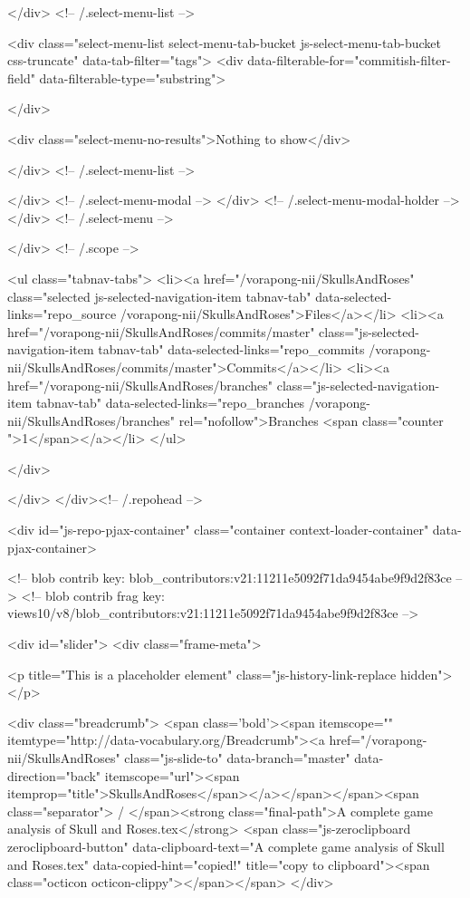          </div> <!-- /.select-menu-list -->


          <div class="select-menu-list select-menu-tab-bucket js-select-menu-tab-bucket css-truncate" data-tab-filter="tags">
            <div data-filterable-for="commitish-filter-field" data-filterable-type="substring">

            </div>

            <div class="select-menu-no-results">Nothing to show</div>

          </div> <!-- /.select-menu-list -->

        </div> <!-- /.select-menu-modal -->
      </div> <!-- /.select-menu-modal-holder -->
    </div> <!-- /.select-menu -->

  </div> <!-- /.scope -->

  <ul class="tabnav-tabs">
    <li><a href="/vorapong-nii/SkullsAndRoses" class="selected js-selected-navigation-item tabnav-tab" data-selected-links="repo_source /vorapong-nii/SkullsAndRoses">Files</a></li>
    <li><a href="/vorapong-nii/SkullsAndRoses/commits/master" class="js-selected-navigation-item tabnav-tab" data-selected-links="repo_commits /vorapong-nii/SkullsAndRoses/commits/master">Commits</a></li>
    <li><a href="/vorapong-nii/SkullsAndRoses/branches" class="js-selected-navigation-item tabnav-tab" data-selected-links="repo_branches /vorapong-nii/SkullsAndRoses/branches" rel="nofollow">Branches <span class="counter ">1</span></a></li>
  </ul>

</div>

  
  
  


            
          </div>
        </div><!-- /.repohead -->

        <div id="js-repo-pjax-container" class="container context-loader-container" data-pjax-container>
          


<!-- blob contrib key: blob_contributors:v21:11211e5092f71da9454abe9f9d2f83ce -->
<!-- blob contrib frag key: views10/v8/blob_contributors:v21:11211e5092f71da9454abe9f9d2f83ce -->


<div id="slider">
    <div class="frame-meta">

      <p title="This is a placeholder element" class="js-history-link-replace hidden"></p>

        <div class="breadcrumb">
          <span class='bold'><span itemscope="" itemtype="http://data-vocabulary.org/Breadcrumb"><a href="/vorapong-nii/SkullsAndRoses" class="js-slide-to" data-branch="master" data-direction="back" itemscope="url"><span itemprop="title">SkullsAndRoses</span></a></span></span><span class="separator"> / </span><strong class="final-path">A complete game analysis of Skull and Roses.tex</strong> <span class="js-zeroclipboard zeroclipboard-button" data-clipboard-text="A complete game analysis of Skull and Roses.tex" data-copied-hint="copied!" title="copy to clipboard"><span class="octicon octicon-clippy"></span></span>
        </div>

